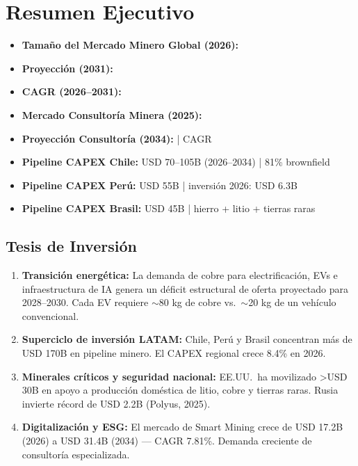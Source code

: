 \chapter{Resumen Ejecutivo}

\begin{marketdatabox}
\begin{itemize}[leftmargin=*]
    \item \textbf{Tamaño del Mercado Minero Global (2026):} 
    \item \textbf{Proyección (2031):} 
    \item \textbf{CAGR (2026--2031):} 
    \item \textbf{Mercado Consultoría Minera (2025):} 
    \item \textbf{Proyección Consultoría (2034):}  | CAGR 
    \item \textbf{Pipeline CAPEX Chile:} USD 70--105B (2026--2034) | 81\% brownfield
    \item \textbf{Pipeline CAPEX Perú:} USD 55B | inversión 2026: USD 6.3B
    \item \textbf{Pipeline CAPEX Brasil:} USD 45B | hierro + litio + tierras raras
\end{itemize}
\end{marketdatabox}

\section{Tesis de Inversión}

\begin{keyinsightbox}
\begin{enumerate}
    \item \textbf{Transición energética:} La demanda de cobre para electrificación, EVs e infraestructura de IA genera un déficit estructural de oferta proyectado para 2028--2030. Cada EV requiere $\sim$80 kg de cobre vs.\ $\sim$20 kg de un vehículo convencional.
    \item \textbf{Superciclo de inversión LATAM:} Chile, Perú y Brasil concentran más de USD 170B en pipeline minero. El CAPEX regional crece 8.4\% en 2026.
    \item \textbf{Minerales críticos y seguridad nacional:} EE.UU.\ ha movilizado >USD 30B en apoyo a producción doméstica de litio, cobre y tierras raras. Rusia invierte récord de USD 2.2B (Polyus, 2025).
    \item \textbf{Digitalización y ESG:} El mercado de Smart Mining crece de USD 17.2B (2026) a USD 31.4B (2034) — CAGR 7.81\%. Demanda creciente de consultoría especializada.
\end{enumerate}
\end{keyinsightbox}

